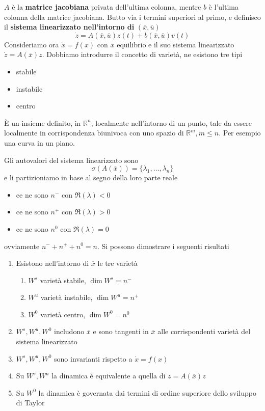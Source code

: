 $A$ è la \textbf{matrice jacobiana} privata dell'ultima colonna, mentre $b$ è l'ultima colonna della matrice jacobiana. Butto via i termini superiori al primo, e definisco il \textbf{sistema linearizzato nell'intorno di }$(\overline{x},\overline{u})$
\begin{equation*}
	\boxed{\dot{z} =A(\overline{x},\overline{u}) z(t)+b(\overline x,\overline u)v(t)}
\end{equation*}
Consideriamo ora $\dot{x} =f(x)$ con $\overline{x}$ equilibrio e il suo sistema linearizzato $\dot{z} =A(\overline{x}) z$. Dobbiamo introdurre il concetto di varietà, ne esistono tre tipi
\begin{itemize}
	\item stabile
	\item instabile
	\item centro
\end{itemize}

È un insieme definito, in $\mathbb{R}^n$, localmente nell'intorno di un punto, tale da essere localmente in corrispondenza biunivoca con uno spazio di $\mathbb{R}^m ,m\leq n$. Per esempio una curva in un piano.

Gli autovalori del sistema linearizzato sono
\begin{equation*}
	\sigma (A(\overline{x})) =\{\lambda _1 ,\dotsc ,\lambda _n\}
\end{equation*}
e li partizioniamo in base al segno della loro parte reale
\begin{itemize}
	\item ce ne sono $n^{-}$ con $\Re(\lambda) < 0$
	\item ce ne sono $n^{+}$ con $\Re(\lambda)  >0$
	\item ce ne sono $n^0$ con $\Re(\lambda) =0$
\end{itemize}

ovviamente $n^{-} +n^{+} +n^0 =n$. Si possono dimostrare i seguenti risultati
\begin{enumerate}
	\item Esistono nell'intorno di $\overline{x}$ le tre varietà
	      \begin{enumerate}
	      	\item $W^s$ varietà stabile, $\dim W^s =n^{-}$
	      	\item $W^u$ varietà instabile, $\dim W^u =n^{+}$
	      	\item $W^0$ varietà centro, $\dim W^0 =n^0$
	      \end{enumerate}
	\item $W^s ,W^u ,W^0$ includono $\overline{x}$ e sono tangenti in $\overline{x}$ alle corrispondenti varietà del sistema linearizzato
	\item $W^s ,W^u ,W^0$ sono invarianti rispetto a $\dot{x} =f(x)$
	\item Su $W^s ,W^u$ la dinamica è equivalente a quella di $\dot{z} =A(\overline{x}) z$
	\item Su $W^0$ la dinamica è governata dai termini di ordine superiore dello sviluppo di Taylor
\end{enumerate}

